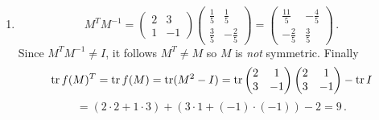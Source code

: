 \begin{enumerate}
\item
\[
M^T M^{-1}=
\begin{pmatrix}2&3\\1&-1\end{pmatrix}\begin{pmatrix}\frac15&\frac15\\[1mm]\frac35&-\frac25\end{pmatrix}
=\begin{pmatrix}\frac{11}5&-\frac45\\-\frac25&\frac35\end{pmatrix}\, .
\]
Since $M^TM^{-1}\neq I$, it follows $M^T\neq M$ so $M$ is {\itshape not} symmetric.
Finally
\[
\operatorname{tr} f(M)^T= \operatorname{tr} f(M) = \operatorname{tr}(M^2-I)=\operatorname{tr}\begin{pmatrix}2&1\\3&-1\end{pmatrix}\begin{pmatrix}2&1\\3&-1\end{pmatrix}-\operatorname{tr} I
\]
\[
=(2\cdot 2+1\cdot 3)+(3\cdot 1+(-1)\cdot(-1))-2=9\, .
\]


\end{enumerate}
